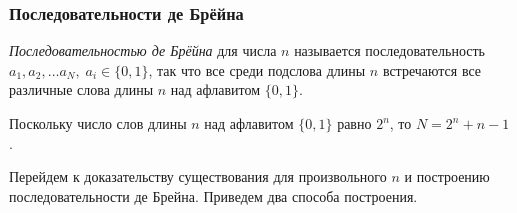 \subsubsection{Последовательности де Брёйна}

\begin{Def}
	\emph{Последовательностью де Брёйна} для числа $ n $ называется последовательность $ a_1, a_2, \ldots a_N, \;a_i \in \{0, 1\} $, так что все среди подслова длины $ n $ встречаются все различные слова длины $ n $ над афлавитом $ \{0, 1\} $.
\end{Def}

Поскольку число слов длины $ n $ над афлавитом $ \{0, 1\} $ равно $ 2^n $, то $ N = 2^n + n - 1 $.

Перейдем к доказательству существования для произвольного $ n $ и построению последовательности де Брейна. Приведем два способа построения.


